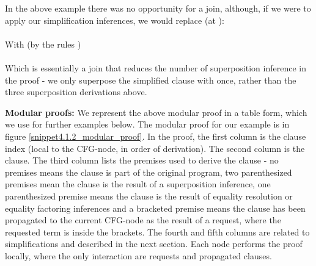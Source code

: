 In the above example there was no opportunity for a join, 
although, if we were to apply our simplification inferences, we would replace (at ):\\
\\
With (by the rules )\\
\\
Which is essentially a join that reduces the number of superposition inference in the proof - 
we only superpose the simplified clause with  once, rather than the three superposition derivations above.

\bigskip
\noindent
\textbf{Modular proofs:}
We represent the above modular proof in a table form, which we use for further examples below. 
The modular proof for our example is in figure \ref{snippet4.1.2_modular_proof}.
In the proof, the first column is the clause index (local to the CFG-node, in order of derivation). The second column is the clause.
The third column lists the premises used to derive the clause - no premises means the clause is part of the original program,
two parenthesized premises mean the clause is the result of a superposition inference, one parenthesized premise means the clause is the result of equality resolution or equality factoring inferences and a bracketed premise means the clause has been propagated to the current CFG-node as the result of a request, where the requested term is inside the brackets.
The fourth and fifth columns are related to simplifications and described in the next section.
Each node performs the proof locally, where the only interaction are requests and propagated clauses.


